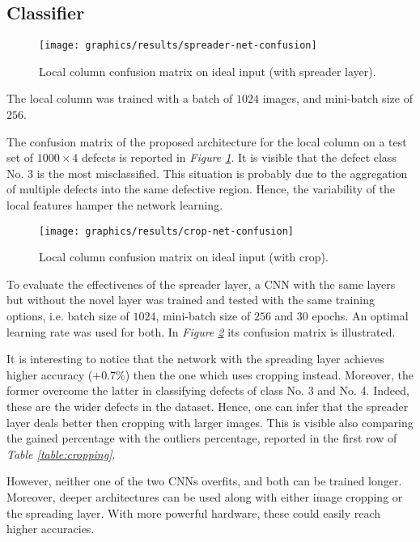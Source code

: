 \subsection{Classifier}\label{section:results:classifier}
\begin{figure}
	\centering
	\texttt{[image: graphics/results/spreader-net-confusion]}
	\caption{Local column confusion matrix on ideal input (with spreader layer).}\label{fig:local-confusion-spreader}
\end{figure}
\par{
	The local column was trained with a batch of $1024$ images, and mini-batch size of $256$.
}
\par{
	The confusion matrix of the proposed architecture for the local column on a test set of $1000\times 4$ defects is reported in \emph{Figure \ref{fig:local-confusion-spreader}}. It is visible that the defect class No. 3 is the most misclassified. This situation is probably due to the aggregation of multiple defects into the same defective region. Hence, the variability of the local features hamper the network learning.
}
\begin{figure}
	\centering
	\texttt{[image: graphics/results/crop-net-confusion]}
	\caption{Local column confusion matrix on ideal input (with crop).}\label{fig:local-confusion-crop}
\end{figure}
\par{
	To evaluate the effectivenes of the spreader layer, a CNN with the same layers but without the novel layer was trained and tested with the same training options, i.e. batch size of $1024$, mini-batch size of $256$ and $30$ epochs. An optimal learning rate was used for both. In \emph{Figure \ref{fig:local-confusion-crop}} its confusion matrix is illustrated.
}
\par{
	It is interesting to notice that the network with the spreading layer achieves higher accuracy ($+0.7\%$) then the one which uses cropping instead. Moreover, the former overcome the latter in classifying defects of class No. 3 and No. 4. Indeed, these are the wider defects in the dataset. Hence, one can infer that the spreader layer deals better then cropping with larger images. This is visible also comparing the gained percentage with the outliers percentage, reported in the first row of \emph{Table \ref{table:cropping}}.
}
\par{
	However, neither one of the two CNNs overfits, and both can be trained longer. Moreover, deeper architectures can be used along with either image cropping or the spreading layer. With more powerful hardware, these could easily reach higher accuracies. 
}
